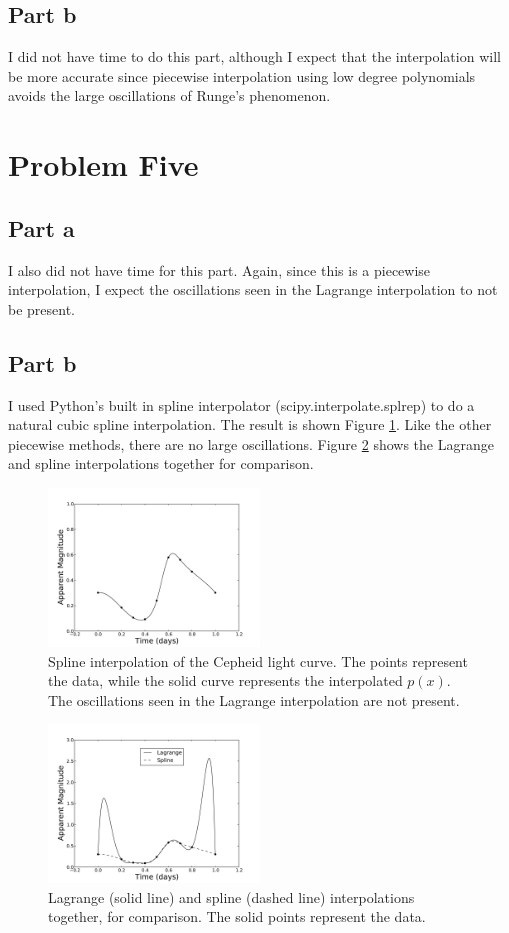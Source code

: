 \documentclass[11pt,letterpaper]{article}
\begin{document}
\subsection{Part b}
I did not have time to do this part, although I expect that the 
interpolation will be more accurate since piecewise interpolation 
using low degree polynomials avoids the large oscillations of 
Runge's phenomenon.

\section{Problem Five}
\subsection{Part a}
I also did not have time for this part.  Again, since this is a 
piecewise interpolation, I expect the oscillations seen in the 
Lagrange interpolation to not be present.

\subsection{Part b}
I used Python's built in spline interpolator (scipy.interpolate.splrep) 
to do a natural cubic spline interpolation.  The result is shown 
Figure \ref{fig:five}.  Like the other piecewise methods, there are 
no large oscillations.  Figure \ref{fig:five2} shows the Lagrange 
and spline interpolations together for comparison.

\begin{figure}
\centering
\includegraphics[width=0.5\textwidth]{fiveb.pdf}
\caption{Spline interpolation of the Cepheid light curve.  The 
points represent the data, while the solid curve represents 
the interpolated $p(x)$.  The 
oscillations seen in the Lagrange interpolation are not present.}
\label{fig:five}
\end{figure} 

\begin{figure}
\centering
\includegraphics[width=0.5\textwidth]{five2.pdf}
\caption{Lagrange (solid line) and spline (dashed line) interpolations 
together, for comparison.  The solid points represent the data.}
\label{fig:five2}
\end{figure} 
\end{document}
